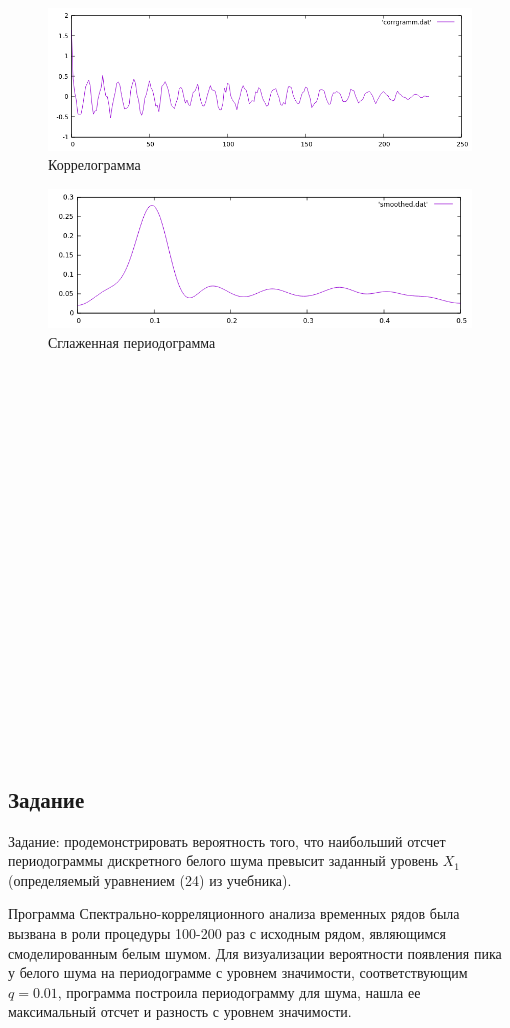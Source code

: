 \documentclass[12pt]{article}
\begin{document}
		\begin{figure}[h]
			\centering
			\includegraphics[width=13cm]{corrgramm.png} 
			\caption{Коррелограмма} 
			\label{fig.0} 
		\end{figure}

		\begin{figure}[h]
			\centering
			\includegraphics[width=13cm]{smoothed.png} 
			\caption{Сглаженная периодограмма} 
			\label{fig.0} 
		\end{figure}



\

\

\

\

\

\

\

\

\

\

\

\

\newpage

	\subsection*{Задание}
	Задание: продемонстрировать вероятность того, что наибольший отсчет периодограммы дискретного белого шума превысит заданный уровень $X_1$ (определяемый уравнением (24) из учебника). 
	
	Программа Спектрально-корреляционного анализа временных рядов была вызвана в роли процедуры 100-200 раз с исходным рядом, являющимся смоделированным белым шумом. Для визуализации вероятности появления пика у белого шума на периодограмме с уровнем значимости, соответствующим $q=0.01$, программа построила периодограмму для шума, нашла ее максимальный отсчет и разность с уровнем значимости.
	
\end{document}
